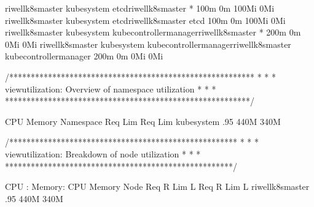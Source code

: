 \documentclass[letterpaper,10pt,english]{sphinxmanual}
\begin{document}
\begin{sphinxVerbatim}[commandchars=\\\{\}]
riwell\PYGZhy{}k8s\PYGZhy{}master   kube\PYGZhy{}system   etcd\PYGZhy{}riwell\PYGZhy{}k8s\PYGZhy{}master                      *                         100m \PYGZpc{}      0m \PYGZpc{}      100Mi \PYGZpc{}        0Mi \PYGZpc{}
riwell\PYGZhy{}k8s\PYGZhy{}master   kube\PYGZhy{}system   etcd\PYGZhy{}riwell\PYGZhy{}k8s\PYGZhy{}master                      etcd                      100m \PYGZpc{}      0m \PYGZpc{}      100Mi \PYGZpc{}        0Mi \PYGZpc{}
riwell\PYGZhy{}k8s\PYGZhy{}master   kube\PYGZhy{}system   kube\PYGZhy{}controller\PYGZhy{}manager\PYGZhy{}riwell\PYGZhy{}k8s\PYGZhy{}master   *                         200m \PYGZpc{}     0m \PYGZpc{}      0Mi \PYGZpc{}          0Mi \PYGZpc{}
riwell\PYGZhy{}k8s\PYGZhy{}master   kube\PYGZhy{}system   kube\PYGZhy{}controller\PYGZhy{}manager\PYGZhy{}riwell\PYGZhy{}k8s\PYGZhy{}master   kube\PYGZhy{}controller\PYGZhy{}manager   200m \PYGZpc{}     0m \PYGZpc{}      0Mi \PYGZpc{}          0Mi \PYGZpc{}

/*********************************************************
 *                                                       *
 *  view\PYGZhy{}utilization: Overview of namespace utilization  *
 *                                                       *
 *********************************************************/

             CPU        Memory
Namespace     Req  Lim   Req   Lim
kube\PYGZhy{}system  .95      440M  340M

/*****************************************************
 *                                                   *
 *  view\PYGZhy{}utilization: Breakdown of node utilization  *
 *                                                   *
 *****************************************************/

CPU   : \PYGZus{}
Memory: \PYGZus{}
                   CPU                   Memory
Node                Req   \PYGZpc{}R  Lim    \PYGZpc{}L   Req   \PYGZpc{}R   Lim    \PYGZpc{}L
riwell\PYGZhy{}k8s\PYGZhy{}master  .95  \PYGZpc{}        \PYGZpc{}  440M   \PYGZpc{}  340M    \PYGZpc{}
\end{sphinxVerbatim}
\end{document}
